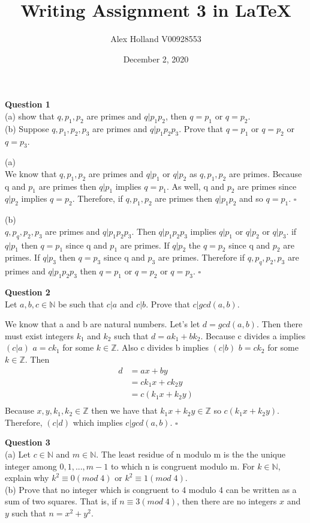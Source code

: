 \documentclass{article}
\title{Writing Assignment 3 in \LaTeX}
\author{Alex Holland V00928553 }
\date{December 2, 2020}
\begin{document}
\maketitle

\bigskip

{\bf Question 1}\\ 
(a) show that $q,p_1,p_2$ are primes and $q|p_1p_2$, then $q=p_1$ or $q=p_2$.\\
(b) Suppose $q,p_1,p_2,p_3$ are primes and $q|p_1p_2p_3$. Prove that $q=p_1$ or $q=p_2$ or $q=p_3$.


\smallskip
(a)\\
We know that $q,p_1,p_2$ are primes and $q|p_1$ or $q|p_2$ as $q,p_1,p_2$ are primes. Because q and $p_1$ are primes then $q|p_1$ implies $q=p_1$. As well, q and $p_2$ are primes since $q|p_2$ implies $q=p_2$. Therefore, if $q,p_1,p_2$ are primes then $q|p_1p_2$ and so $q=p_1$. $\square$

\smallskip
(b)\\
$q,p_q,p_2,p_3$ are primes and $q|p_1p_2p_3$. Then $q|p_1p_2p_3$ implies $q|p_1$ or $q|p_2$ or $q|p_3$. if $q|p_1$ then $q=p_1$ since q and $p_1$ are primes. If $q|p_2$ the $q=p_2$ since q and $p_2$ are primes. If $q|p_3$ then $q=p_3$ since q and $p_3$ are primes. Therefore if $q,p_q,p_2,p_3$ are primes and $q|p_1p_2p_3$ then $q=p_1$ or $q=p_2$ or $q=p_3$. $\square$

\bigskip
{\bf Question 2} \\
Let $a,b,c \in \mathbb{N}$ be such that $c|a$ and $c|b$. Prove that $c|gcd(a,b)$.

\smallskip
We know that a and b are natural numbers. Let's let $d=gcd(a,b)$. Then there must exist integers $k_1$ and $k_2$ such that $d=ak_1+bk_2$. Because c divides a  implies $(c|a)$ $a=ck_1$ for some $k\in\mathbb{Z}$. Also c divides b implies $(c|b)$ $b=ck_2$ for some $k\in\mathbb{Z}$. Then
\begin{equation*} 
\begin{split}
    d & =ax+by\\
    & = ck_1x+ck_2y\\
    & = c(k_1x+k_2y)\\
\end{split}
\end{equation*}
Because $x,y,k_1,k_2 \in \mathbb{Z}$ then we have that $k_1x+k_2y \in \mathbb{Z}$ so $c(k_1x+k_2y)$. Therefore, $(c|d)$ which implies $c|gcd(a,b)$. $\square$

\bigskip
{\bf Question 3}\\
(a) Let $c \in \mathbb{N}$ and $m \in \mathbb{N}$. The least residue of n modulo m is the the unique integer among $0,1,...,m-1$ to which n is congruent modulo m. For $k \in \mathbb{N}$, explain why $k^2\equiv0(mod\;4)$ or $k^2\equiv1(mod\;4)$.\\
(b) Prove that no integer which is congruent to 4 modulo 4 can be written as a sum of two squares. That is, if $n\equiv3(mod\;4)$, then there are no integers $x$ and $y$ such that $n=x^2+y^2$.
\end{document}
